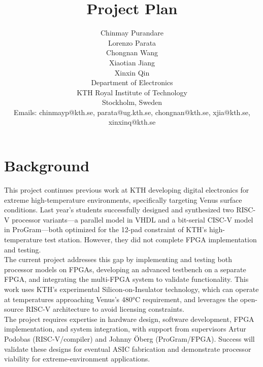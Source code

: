 \documentclass[10pt,twocolumn]{article}
\title{\textbf{Project Plan }}
\author{Chinmay Purandare\\
Lorenzo Parata\\
Chongnan Wang\\
Xiaotian Jiang \\
Xinxin Qin \\
Department of Electronics\\
KTH Royal Institute of Technology\\
Stockholm, Sweden\\
Emails: chinmayp@kth.se, parata@ug.kth.se, chongnan@kth.se, xjia@kth.se, xinxinq@kth.se}
\date{}
\begin{document}
\maketitle


\section{Background}
This project continues previous work at KTH developing digital electronics for extreme high-temperature environments, specifically targeting Venus surface conditions. Last year's students successfully designed and synthesized two RISC-V processor variants—a parallel model in VHDL and a bit-serial CISC-V model in ProGram—both optimized for the 12-pad constraint of KTH's high-temperature test station. However, they did not complete FPGA implementation and testing.\\
The current project addresses this gap by implementing and testing both processor models on FPGAs, developing an advanced testbench on a separate FPGA, and integrating the multi-FPGA system to validate functionality. This work uses KTH's experimental Silicon-on-Insulator technology, which can operate at temperatures approaching Venus's 480°C requirement, and leverages the open-source RISC-V architecture to avoid licensing constraints.\\
The project requires expertise in hardware design, software development, FPGA implementation, and system integration, with support from supervisors Artur Podobas (RISC-V/compiler) and Johnny Öberg (ProGram/FPGA). Success will validate these designs for eventual ASIC fabrication and demonstrate processor viability for extreme-environment applications.
\end{document}
